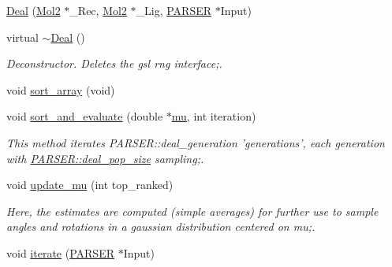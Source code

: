 \begin{DoxyCompactItemize}
\item 
\hyperlink{classDeal_acc21499a89384247e4fb15568cf17982}{Deal} (\hyperlink{classMol2}{Mol2} $\ast$\_\-Rec, \hyperlink{classMol2}{Mol2} $\ast$\_\-Lig, \hyperlink{classPARSER}{PARSER} $\ast$Input)
\item 
\hypertarget{classDeal_a2e59a24920d5ccdd893c0962b92c61af}{
virtual \hyperlink{classDeal_a2e59a24920d5ccdd893c0962b92c61af}{$\sim$Deal} ()}
\label{classDeal_a2e59a24920d5ccdd893c0962b92c61af}

\begin{DoxyCompactList}\small\item\em Deconstructor. Deletes the gsl rng interface;. \item\end{DoxyCompactList}\item 
void \hyperlink{classDeal_ab36a3bcdb00eebadca5d8e1b83903afe}{sort\_\-array} (void)
\item 
\hypertarget{classDeal_abbff975a52cf2cf3c67af7c23ad909ff}{
void \hyperlink{classDeal_abbff975a52cf2cf3c67af7c23ad909ff}{sort\_\-and\_\-evaluate} (double $\ast$\hyperlink{classDeal_a3ebd25a0952e605a7ba348081ca02dff}{mu}, int iteration)}
\label{classDeal_abbff975a52cf2cf3c67af7c23ad909ff}

\begin{DoxyCompactList}\small\item\em This method iterates PARSER::deal\_\-generation 'generations', each generation with \hyperlink{classPARSER_afe06b419ab83ef6d8541b783f7cafe8f}{PARSER::deal\_\-pop\_\-size} sampling;. \item\end{DoxyCompactList}\item 
\hypertarget{classDeal_a61921feaaf8c68aec2964013fdea0c12}{
void \hyperlink{classDeal_a61921feaaf8c68aec2964013fdea0c12}{update\_\-mu} (int top\_\-ranked)}
\label{classDeal_a61921feaaf8c68aec2964013fdea0c12}

\begin{DoxyCompactList}\small\item\em Here, the estimates are computed (simple averages) for further use to sample angles and rotations in a gaussian distribution centered on mu;. \item\end{DoxyCompactList}\item 
\hypertarget{classDeal_add1bf8643006b1c33cf41072e023e128}{
void \hyperlink{classDeal_add1bf8643006b1c33cf41072e023e128}{iterate} (\hyperlink{classPARSER}{PARSER} $\ast$Input)}
\label{classDeal_add1bf8643006b1c33cf41072e023e128}


\end{DoxyCompactItemize}
